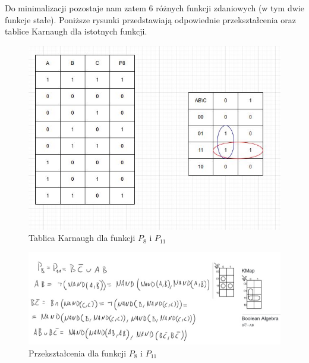 \documentclass[11pt]{article}
\begin{document}
Do minimalizacji pozostaje nam zatem 6 różnych funkcji zdaniowych (w tym dwie funkcje stałe). Poniższe rysunki przedstawiają odpowiednie przekształcenia
oraz tablice Karnaugh dla istotnych funkcji.

\begin{figure}[H]
\centering
\includegraphics[width=.9\linewidth]{../../CW0POPRW/P8.JPG}
\caption{Tablica Karnaugh dla funkcji \(P_8\) i \(P_{11}\)}
\end{figure}
\begin{figure}[H]
\centering
\includegraphics[width=.9\linewidth]{p8p11.jpg}
\caption{Przekształcenia dla funkcji \(P_8\) i \(P_{11}\)}
\end{figure}
\end{document}
